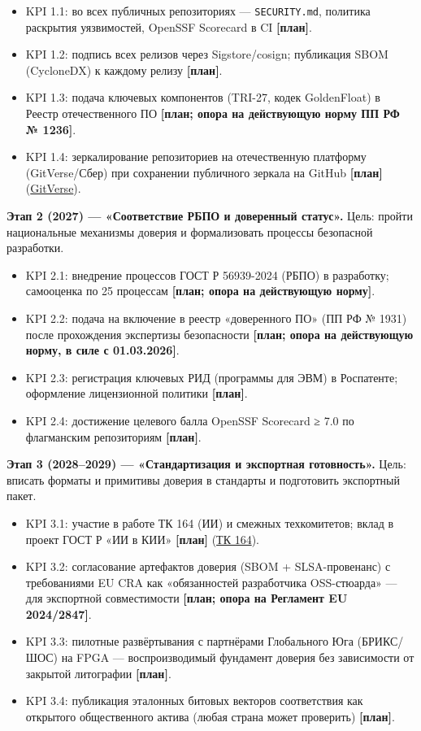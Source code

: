 \documentclass[
  russian,
]{article}
\providecommand{\tightlist}{%
  \setlength{\itemsep}{0pt}\setlength{\parskip}{0pt}}
\begin{document}
\begin{itemize}
\tightlist
\item
  KPI 1.1: во всех публичных репозиториях --- \texttt{SECURITY.md},
  политика раскрытия уязвимостей, OpenSSF Scorecard в CI
  \textbf{{[}план{]}}.
\item
  KPI 1.2: подпись всех релизов через Sigstore/cosign; публикация SBOM
  (CycloneDX) к каждому релизу \textbf{{[}план{]}}.
\item
  KPI 1.3: подача ключевых компонентов (TRI-27, кодек GoldenFloat) в
  Реестр отечественного ПО \textbf{{[}план; опора на действующую норму
  ПП РФ № 1236{]}}.
\item
  KPI 1.4: зеркалирование репозиториев на отечественную платформу
  (GitVerse/Сбер) при сохранении публичного зеркала на GitHub
  \textbf{{[}план{]}} (\href{https://gitverse.ru}{GitVerse}).
\end{itemize}

\textbf{Этап 2 (2027) --- «Соответствие РБПО и доверенный статус».}
Цель: пройти национальные механизмы доверия и формализовать процессы
безопасной разработки.

\begin{itemize}
\tightlist
\item
  KPI 2.1: внедрение процессов ГОСТ Р 56939-2024 (РБПО) в разработку;
  самооценка по 25 процессам \textbf{{[}план; опора на действующую
  норму{]}}.
\item
  KPI 2.2: подача на включение в реестр «доверенного ПО» (ПП РФ № 1931)
  после прохождения экспертизы безопасности \textbf{{[}план; опора на
  действующую норму, в силе с 01.03.2026{]}}.
\item
  KPI 2.3: регистрация ключевых РИД (программы для ЭВМ) в Роспатенте;
  оформление лицензионной политики \textbf{{[}план{]}}.
\item
  KPI 2.4: достижение целевого балла OpenSSF Scorecard ≥ 7.0 по
  флагманским репозиториям \textbf{{[}план{]}}.
\end{itemize}

\textbf{Этап 3 (2028--2029) --- «Стандартизация и экспортная
готовность».} Цель: вписать форматы и примитивы доверия в стандарты и
подготовить экспортный пакет.

\begin{itemize}
\tightlist
\item
  KPI 3.1: участие в работе ТК 164 (ИИ) и смежных техкомитетов; вклад в
  проект ГОСТ Р «ИИ в КИИ» \textbf{{[}план{]}}
  (\href{http://tc164.ru}{ТК 164}).
\item
  KPI 3.2: согласование артефактов доверия (SBOM + SLSA-провенанс) с
  требованиями EU CRA как «обязанностей разработчика OSS-стюарда» ---
  для экспортной совместимости \textbf{{[}план; опора на Регламент EU
  2024/2847{]}}.
\item
  KPI 3.3: пилотные развёртывания с партнёрами Глобального Юга
  (БРИКС/ШОС) на FPGA --- воспроизводимый фундамент доверия без
  зависимости от закрытой литографии \textbf{{[}план{]}}.
\item
  KPI 3.4: публикация эталонных битовых векторов соответствия как
  открытого общественного актива (любая страна может проверить)
  \textbf{{[}план{]}}.
\end{itemize}
\end{document}
